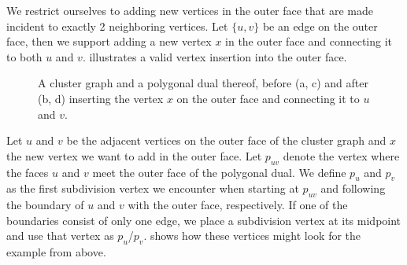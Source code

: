 We restrict ourselves to adding new vertices in the outer face that are made incident to exactly 2 neighboring vertices. Let $\{u,v\}$ be an edge on the outer face, then we support adding a new vertex $x$ in the outer face and connecting it to both $u$ and $v$.  illustrates a valid vertex insertion into the outer face.

\begin{figure}[H]
	\centering
	\quad
	\qquad
	\quad
	\caption{A cluster graph and a polygonal dual thereof, before (a, c) and after (b, d) inserting the vertex $x$ on the outer face and connecting it to $u$ and $v$.}
	\label{fig:insert-vertex-example-outside}
\end{figure}

Let $u$ and $v$ be the adjacent vertices on the outer face of the cluster graph and $x$ the new vertex we want to add in the outer face.
Let $p_{uv}$ denote the vertex where the faces $u$ and $v$ meet the outer face of the polygonal dual.
We define $p_u$ and $p_v$ as the first subdivision vertex we encounter when starting at $p_{uv}$ and following the boundary of $u$ and $v$ with the outer face, respectively.
If one of the boundaries consist of only one edge, we place a subdivision vertex at its midpoint and use that vertex as $p_u$/$p_v$.
 shows how these vertices might look for the example from above.
%

